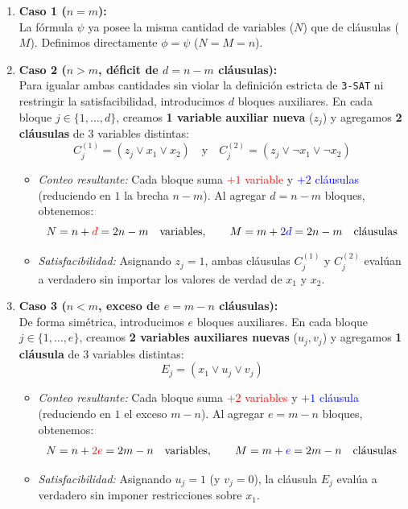 \begin{enumerate}[label=\arabic*., leftmargin=*]
    \item \textbf{Caso 1 ($n = m$):}\\
    La fórmula $\psi$ ya posee la misma cantidad de variables ($N$) que de cláusulas ($M$). Definimos directamente $\phi = \psi$ ($N = M = n$).

    \item \textbf{Caso 2 ($n > m$, déficit de $d = n - m$ cláusulas):}\\
    Para igualar ambas cantidades sin violar la definición estricta de \texttt{3-SAT} ni restringir la satisfacibilidad, introducimos $d$ bloques auxiliares. En cada bloque $j \in \{1, \dots, d\}$, creamos \textbf{1 variable auxiliar nueva} ($z_j$) y agregamos \textbf{2 cláusulas} de $3$ variables distintas:
    \[ C_j^{(1)} = (z_j \lor x_1 \lor x_2) \quad \text{y} \quad C_j^{(2)} = (z_j \lor \neg x_1 \lor \neg x_2) \]
    \begin{itemize}[leftmargin=*]
        \item \textit{Conteo resultante:} Cada bloque suma \textcolor{red}{$+1$ variable} y \textcolor{blue}{$+2$ cláusulas} (reduciendo en $1$ la brecha $n - m$). Al agregar $d = n - m$ bloques, obtenemos:
        \[ N = n + \textcolor{red}{d} = 2n - m \quad \text{variables}, \qquad M = m + \textcolor{blue}{2d} = 2n - m \quad \text{cláusulas} \]
        \item \textit{Satisfacibilidad:} Asignando $z_j = 1$, ambas cláusulas $C_j^{(1)}$ y $C_j^{(2)}$ evalúan a verdadero sin importar los valores de verdad de $x_1$ y $x_2$.
    \end{itemize}

    \item \textbf{Caso 3 ($n < m$, exceso de $e = m - n$ cláusulas):}\\
    De forma simétrica, introducimos $e$ bloques auxiliares. En cada bloque $j \in \{1, \dots, e\}$, creamos \textbf{2 variables auxiliares nuevas} ($u_j, v_j$) y agregamos \textbf{1 cláusula} de $3$ variables distintas:
    \[ E_j = (x_1 \lor u_j \lor v_j) \]
    \begin{itemize}[leftmargin=*]
        \item \textit{Conteo resultante:} Cada bloque suma \textcolor{red}{$+2$ variables} y \textcolor{blue}{$+1$ cláusula} (reduciendo en $1$ el exceso $m - n$). Al agregar $e = m - n$ bloques, obtenemos:
        \[ N = n + \textcolor{red}{2e} = 2m - n \quad \text{variables}, \qquad M = m + \textcolor{blue}{e} = 2m - n \quad \text{cláusulas} \]
        \item \textit{Satisfacibilidad:} Asignando $u_j = 1$ (y $v_j = 0$), la cláusula $E_j$ evalúa a verdadero sin imponer restricciones sobre $x_1$.
    \end{itemize}
\end{enumerate}

